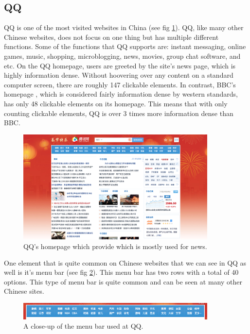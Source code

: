 \subsection{QQ}
QQ is one of the  most visited websites in China (see fig \ref{fig:QQ.com}). \cite{top_sites_china} \cite{top_sites_alexa} QQ, like many other Chinese websites, does not focus on one thing but has multiple different functions. Some of the functions that QQ supports are: instant messaging, online  games, music, shopping, microblogging, news, movies, group chat software, and etc. On the QQ homepage, users are greeted by the site's news page, which is highly information dense. Without hoovering over any content on a standard computer screen, there are roughly 147 clickable elements.  In contrast,  BBC's homepage \cite{bbc}, which is considered fairly information dense by western standards, has only 48 clickable elements on its homepage. This means that with only counting clickable elements, QQ is over 3 times more information dense than BBC. 


\begin{figure}[h]
\centering
\includegraphics[width=100mm]{Images/QQ.png}
\decoRule
\caption[QQ.com]{QQ's homepage which provide which is mostly used for news.}
\label{fig:QQ.com}
\end{figure}

One element that is quite common on Chinese websites that we can see in QQ as well is it's menu bar (see fig \ref{fig:QQ_menubar}). This menu bar has two rows with a total of 40 options. This type of menu bar is quite common and can be seen at many other Chinese sites.


\begin{figure}[h]
\centering
\includegraphics[width=100mm]{Images/QQ_menubar.png}
\decoRule
\caption[QQ's Menu bar]{A close-up of the menu bar used at QQ.}
\label{fig:QQ_menubar}
\end{figure}

